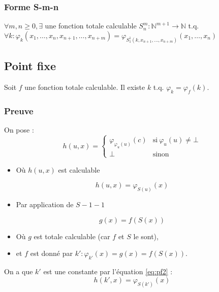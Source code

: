 \subsubsection{Forme S-m-n}

$\forall m,n \geq 0, \exists$ une fonction totale calculable $S^m_n : \mathbb{N}^{m+1} \rightarrow \mathbb{N}$ t.q. $\forall k : \varphi_k(x_1, \ldots, x_n, x_{n+1}, \ldots, x_{n+m}) = \varphi_{S^1_1(k,x_{n+1}, \ldots, x_{n+m})}(x_1, \ldots, x_n)$

\newpage
\subsection{Point fixe}

Soit $f$ une fonction totale calculable. Il existe $k$ t.q. $\varphi_k = \varphi_f(k)$.

\subsubsection{Preuve}

On pose :
\begin{equation}\label{eq:pf1}
h(u,x) =
\begin{cases}
	\varphi_{\varphi_u(u)}(c) & \text{si}\ \varphi_u(u) \neq \bot\\
	\bot & \text{sinon}
\end{cases}
\end{equation}
\begin{itemize}
\item[] Où $h(u,x)$ est calculable
\end{itemize}
\begin{equation}\label{eq:pf2}
h(u,x) = \varphi_{S(u)}(x)
\end{equation}
\begin{itemize}
\item[] Par application de $S-1-1$
\end{itemize}
\begin{equation}\label{eq:pf3}
g(x) = f(S(x))
\end{equation}
\begin{itemize}
\item[] Où $g$ est totale calculable (car $f$ et $S$ le sont),
\item[] et $f$ est donné par $k' : \varphi_{k'}(x) = g(x) = f(S(x))$.
\end{itemize}

\medskip

On a que $k'$ est une constante par l'équation \ref{eq:pf2} :
\begin{equation*}
h(k',x) = \varphi_{S(k')}(x)
\end{equation*}

